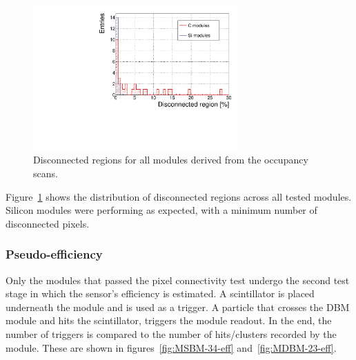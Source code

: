 \begin{figure}[!t]
\centering
\includegraphics[width=0.7\textwidth]{../scripts/04_charge_monitoring/plots/disconnectedregion} \caption{Disconnected regions for all modules derived from the occupancy scans.}
\label{fig:disconreg}
\end{figure}

Figure~\ref{fig:disconreg} shows the distribution of disconnected regions across all tested modules. Silicon modules were performing as expected, with a minimum number of disconnected pixels.




\subsubsection{Pseudo-efficiency}
Only the modules that passed the pixel connectivity test undergo the second test stage in which the sensor's efficiency is estimated. A scintillator is placed underneath the module and is used as a trigger. A particle that crosses the DBM module and hits the scintillator, triggers the module readout. In the end, the number of triggers is compared to the number of hits/clusters recorded by the module. These are shown in figures~\ref{fig:MSBM-34-eff} and~\ref{fig:MDBM-23-eff}. 

